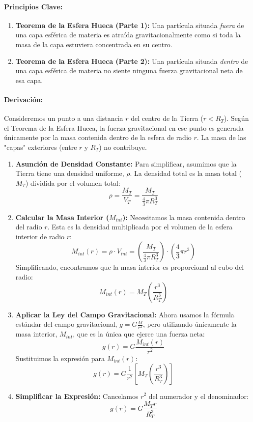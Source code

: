 \documentclass[11pt,a4paper]{book}
\begin{document}
\paragraph{Principios Clave:}
\begin{enumerate}
    \item \textbf{Teorema de la Esfera Hueca (Parte 1):} Una partícula situada \textit{fuera} de una capa esférica de materia es atraída gravitacionalmente como si toda la masa de la capa estuviera concentrada en su centro.
    \item \textbf{Teorema de la Esfera Hueca (Parte 2):} Una partícula situada \textit{dentro} de una capa esférica de materia no siente ninguna fuerza gravitacional neta de esa capa.
\end{enumerate}

\paragraph{Derivación:}
Consideremos un punto a una distancia $r$ del centro de la Tierra ($r < R_T$). Según el Teorema de la Esfera Hueca, la fuerza gravitacional en ese punto es generada únicamente por la masa contenida dentro de la esfera de radio $r$. La masa de las "capas" exteriores (entre $r$ y $R_T$) no contribuye.

\begin{enumerate}
    \item \textbf{Asunción de Densidad Constante:} Para simplificar, asumimos que la Tierra tiene una densidad uniforme, $\rho$. La densidad total es la masa total ($M_T$) dividida por el volumen total:
    \[ \rho = \frac{M_T}{V_T} = \frac{M_T}{\frac{4}{3}\pi R_T^3} \]

    \item \textbf{Calcular la Masa Interior ($M_{int}$):} Necesitamos la masa contenida dentro del radio $r$. Esta es la densidad multiplicada por el volumen de la esfera interior de radio $r$:
    \[ M_{int}(r) = \rho \cdot V_{int} = \left( \frac{M_T}{\frac{4}{3}\pi R_T^3} \right) \cdot \left( \frac{4}{3}\pi r^3 \right) \]
    Simplificando, encontramos que la masa interior es proporcional al cubo del radio:
    \[ M_{int}(r) = M_T \left( \frac{r^3}{R_T^3} \right) \]

    \item \textbf{Aplicar la Ley del Campo Gravitacional:} Ahora usamos la fórmula estándar del campo gravitacional, $g = G \frac{M}{r^2}$, pero utilizando únicamente la masa interior, $M_{int}$, que es la única que ejerce una fuerza neta:
    \[ g(r) = G \frac{M_{int}(r)}{r^2} \]
    Sustituimos la expresión para $M_{int}(r)$:
    \[ g(r) = G \frac{1}{r^2} \left[ M_T \left( \frac{r^3}{R_T^3} \right) \right] \]

    \item \textbf{Simplificar la Expresión:} Cancelamos $r^2$ del numerador y el denominador:
    \[ g(r) = G \frac{M_T r}{R_T^3} \]
\end{enumerate}
\end{document}
